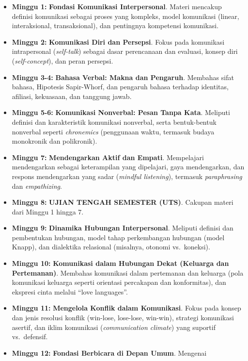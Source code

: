 \documentclass[
  letterpaper,
  DIV=11,
  numbers=noendperiod]{scrreprt}
\providecommand{\tightlist}{%
  \setlength{\itemsep}{0pt}\setlength{\parskip}{0pt}}
\begin{document}
\begin{itemize}
\tightlist
\item
  \textbf{Minggu 1:} \textbf{Fondasi Komunikasi Interpersonal}. Materi
  mencakup definisi komunikasi sebagai proses yang kompleks, model
  komunikasi (linear, interaksional, transaksional), dan pentingnya
  kompetensi komunikasi.
\item
  \textbf{Minggu 2:} \textbf{Komunikasi Diri dan Persepsi}. Fokus pada
  komunikasi intrapersonal (\emph{self-talk}) sebagai dasar perencanaan
  dan evaluasi, konsep diri (\emph{self-concept}), dan peran persepsi.
\item
  \textbf{Minggu 3-4:} \textbf{Bahasa Verbal: Makna dan Pengaruh}.
  Membahas sifat bahasa, Hipotesis Sapir-Whorf, dan pengaruh bahasa
  terhadap identitas, afiliasi, kekuasaan, dan tanggung jawab.
\item
  \textbf{Minggu 5-6:} \textbf{Komunikasi Nonverbal: Pesan Tanpa Kata}.
  Meliputi definisi dan karakteristik komunikasi nonverbal, serta
  bentuk-bentuk nonverbal seperti \emph{chronemics} (penggunaan waktu,
  termasuk budaya monokronik dan polikronik).
\item
  \textbf{Minggu 7:} \textbf{Mendengarkan Aktif dan Empati}. Mempelajari
  mendengarkan sebagai keterampilan yang dipelajari, gaya mendengarkan,
  dan respons mendengarkan yang sadar (\emph{mindful listening}),
  termasuk \emph{paraphrasing} dan \emph{empathizing}.
\item
  \textbf{Minggu 8:} \textbf{UJIAN TENGAH SEMESTER (UTS)}. Cakupan
  materi dari Minggu 1 hingga 7.
\item
  \textbf{Minggu 9:} \textbf{Dinamika Hubungan Interpersonal}. Meliputi
  definisi dan pembentukan hubungan, model tahap perkembangan hubungan
  (model Knapp), dan dialektika relasional (misalnya, otonomi
  vs.~koneksi).
\item
  \textbf{Minggu 10:} \textbf{Komunikasi dalam Hubungan Dekat (Keluarga
  dan Pertemanan)}. Membahas komunikasi dalam pertemanan dan keluarga
  (pola komunikasi keluarga seperti orientasi percakapan dan
  konformitas), dan ekspresi cinta melalui ``love languages''.
\item
  \textbf{Minggu 11:} \textbf{Mengelola Konflik dalam Komunikasi}. Fokus
  pada konsep dan jenis resolusi konflik (win-lose, lose-lose, win-win),
  strategi komunikasi asertif, dan iklim komunikasi (\emph{communication
  climate}) yang suportif vs.~defensif.
\item
  \textbf{Minggu 12:} \textbf{Fondasi Berbicara di Depan Umum}. Mengenai

\end{itemize}
\end{document}
